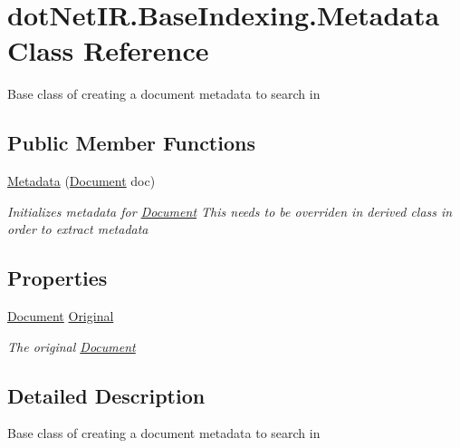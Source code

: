 \hypertarget{classdot_net_i_r_1_1_base_indexing_1_1_metadata}{}\section{dot\+Net\+I\+R.\+Base\+Indexing.\+Metadata Class Reference}
\label{classdot_net_i_r_1_1_base_indexing_1_1_metadata}


Base class of creating a document metadata to search in  


\subsection*{Public Member Functions}
\begin{DoxyCompactItemize}
\item 
\hyperlink{classdot_net_i_r_1_1_base_indexing_1_1_metadata_a56f25f691e16450838af09943c68c1c3}{Metadata} (\hyperlink{classdot_net_i_r_1_1_base_indexing_1_1_document}{Document} doc)
\begin{DoxyCompactList}\small\item\em Initializes metadata for \hyperlink{classdot_net_i_r_1_1_base_indexing_1_1_document}{Document} This needs to be overriden in derived class in order to extract metadata \end{DoxyCompactList}\end{DoxyCompactItemize}
\subsection*{Properties}
\begin{DoxyCompactItemize}
\item 
\hyperlink{classdot_net_i_r_1_1_base_indexing_1_1_document}{Document} \hyperlink{classdot_net_i_r_1_1_base_indexing_1_1_metadata_a0df188ffc37ffeec37ad5e28b28c7021}{Original}
\begin{DoxyCompactList}\small\item\em The original \hyperlink{classdot_net_i_r_1_1_base_indexing_1_1_document}{Document} \end{DoxyCompactList}\end{DoxyCompactItemize}


\subsection{Detailed Description}
Base class of creating a document metadata to search in 



